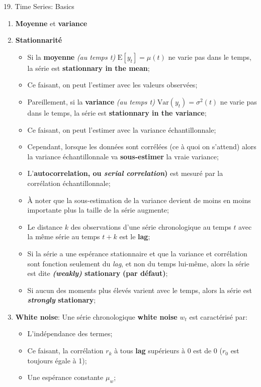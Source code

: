 \documentclass[12pt, titlepage, french]{report}
\begin{document}
\begin{CHPT_SUMM}{19. Time Series: Basics}
\begin{enumerate}
\begin{itemize}
		\end{itemize} 
	\item	\textbf{Moyenne} et \textbf{variance}
	\item[]	\textbf{Stationnarité}
		\begin{itemize}
		\item	Si la \textbf{moyenne} \textit{(au temps t)} $\text{E}[y_{t}] = \mu(t)$ ne varie pas dans le temps, la série est \textbf{stationnary in the mean};
		\item[]	Ce faisant, on peut l'estimer avec les valeurs observées;
		\item	Pareillement, si la \textbf{variance} \textit{(au temps t)} $\text{Var}(y_{t}) = \sigma^{2}(t)$ ne varie pas dans le temps, la série est \textbf{stationnary in the variance};
		\item[]	Ce faisant, on peut l'estimer avec la variance échantillonnale;
		\item	Cependant, lorsque les données sont corrélées (ce à quoi on s'attend) alors la variance échantillonnale va \textbf{sous-estimer} la vraie variance;
		\item	L'\textbf{autocorrelation, ou \textit{serial correlation})} est mesuré par la corrélation échantillonnale;
		\item[]	À noter que la sous-estimation de la variance devient de moins en moins importante plus la taille de la série augmente;
		\item	Le distance $k$ des observations d'une série chronologique au temps $t$ avec la même série au temps $t + k$ est le \textbf{lag};
		\item	Si la série a une espérance stationnaire et que la variance et corrélation sont fonction seulement du \textit{lag}, et non du temps lui-même, alors la série est dite \textbf{\textit{(weakly)} stationary} \textbf{(par défaut)};
		\item	Si aucun des moments plus élevés varient avec le temps, alors la série est \textbf{\textit{strongly} stationary};
		\end{itemize}
	\item	\textbf{White noise}: Une série chronologique \textbf{white noise}  $w_{t}$ est caractérisé par:
	\begin{itemize}
		\item	L'indépendance des termes;
		\item[]	Ce faisant, la corrélation $r_{k}$ à tous \textbf{lag} supérieurs à 0 est de 0 ($r_{0}$ est toujours égale à 1);
		\item	Une espérance constante $\mu_w$;

\end{itemize}
\end{enumerate}
\end{CHPT_SUMM}
\end{document}
